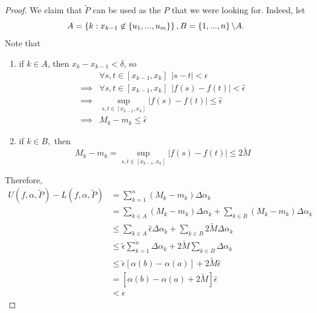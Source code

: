 \begin{proof}
    We claim that $\tilde{P}$ can be used as the $P$ that we were looking for. Indeed, let 
    $$A = \left\{k : x_{k-1} \not \in \left\{u_1, ..., u_m\right\}\right\}, B = \left\{1,...,n\right\} \backslash A.$$
    Note that 
    \begin{enumerate}[$*)$]
        \item if $k \in A$, then $x_k - x_{k-1} < \delta$, so 
        \begin{align*}
            &\forall s, t \in [x_{k-1}, x_k] ~~|s-t| < \epsilon \\
            \implies &\forall s, t \in [x_{k-1}, x_k] ~~|f(s) - f(t)| < \hat{\epsilon} \\
            \implies &\sup \limits_{s,t \in [x_{k-1}, x_k]} |f(s) - f(t)| \leq \hat{\epsilon} \\
            \implies &M_k - m_k \leq \hat{\epsilon}
        \end{align*}

        \item if $k \in B,$ then 
        $$M_k - m_k = \sup \limits_{s,t \in [x_{k-1}, x_k]} |f(s) - f(t)| \leq 2\tilde{M}$$
    \end{enumerate}
    Therefore,
    \begin{align*}
        U(f, \alpha, \tilde{P}) - L(f, \alpha, \tilde{P}) &= \sum_{k=1}^n (M_k - m_k) \Delta \alpha_k \\
        &= \sum_{k\in A} (M_k - m_k)\Delta \alpha_k + \sum_{k \in B} (M_k - m_k) \Delta \alpha_k \\
        &\leq \sum_{k \in A} \hat{\epsilon} \Delta \alpha_k + \sum_{k \in B} 2\tilde{M} \Delta \alpha_k \\
        &\leq \tilde{\epsilon} \sum_{k=1}^{n}\Delta \alpha_k + 2\tilde{M}\sum_{k\in B} \Delta \alpha_k \\
        &\leq \tilde{\epsilon} [\alpha(b) - \alpha(a)] + 2\tilde{M} \hat{\epsilon} \\
        &= [\alpha(b) - \alpha(a) + 2\tilde{M}]\hat{\epsilon} \\
        &< \epsilon
    \end{align*}


\end{proof}
